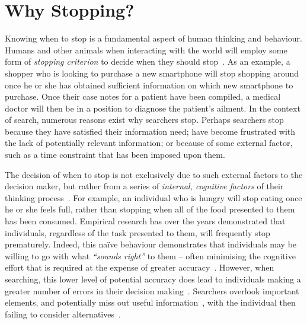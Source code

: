 \section{Why Stopping?}\label{sec:stopping_background:why}
Knowing when to stop is a fundamental aspect of human thinking and behaviour. Humans and other animals when interacting with the world will employ some form of \emph{stopping criterion} to decide when they should stop~\citep{nickles1995judgment}. As an example, a shopper who is looking to purchase a new smartphone will stop shopping around once he or she has obtained sufficient information on which new smartphone to purchase. Once their case notes for a patient have been compiled, a medical doctor will then be in a position to diagnose the patient's ailment. In the context of search, numerous reasons exist why searchers stop. Perhaps searchers stop because they have satisfied their information need; have become frustrated with the lack of potentially relevant information; or because of some external factor, such as a time constraint that has been imposed upon them.

The decision of when to stop is not exclusively due to such external factors to the decision maker, but rather from a series of \emph{internal, cognitive factors} of their thinking process~\citep{nickles1995judgment}. For example, an individual who is hungry will stop eating once he or she feels full, rather than stopping when all of the food presented to them has been consumed. Empirical research has over the years demonstrated that individuals, regardless of the task presented to them, will frequently stop prematurely. Indeed, this na\"{i}ve behaviour demonstrates that individuals may be willing to go with what \emph{``sounds right''} to them -- often minimising the cognitive effort that is required at the expense of greater accuracy~\citep{perkins1983difficulties}. However, when searching, this lower level of potential accuracy does lead to individuals making a greater number of errors in their decision making~\citep{baron1988heuristics}. Searchers overlook important elements, and potentially miss out useful information~\citep{fischhoff1977cost_benefit, fischhoff1978fault, shafir1992thinking}, with the individual then failing to consider alternatives~\citep{farquhar1993decision_structuring}.

